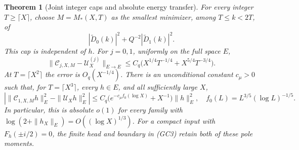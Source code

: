 \documentclass[11pt]{article}
\newtheorem{theorem}{Theorem}
\theoremstyle{remark}\newtheorem{remark}[theorem]{Remark}
\begin{document}
\begin{theorem}[Joint integer caps and absolute energy transfer]
\label{thm:joint-integer-gamma-completion}
For every integer \(T\ge\lceil X\rceil\), choose \(M=M_*(X,T)\)
as the smallest minimizer, among \(T\le k<2T\), of
\[
 |\widetilde D_0(k)|^2+Q^{-2}|\widetilde D_1(k)|^2 .
 \tag{GC4}
\]
This cap is independent of \(h\). For \(j=0,1\), uniformly on
the full space \(E\),
\[
 \|\mathcal C_{j,X,M}-\mathcal U_X^{(j)}\|_{E\to E}
 \le C_q\bigl(X^{1/4}T^{-1/4}+X^{5/4}T^{-3/4}\bigr).
 \tag{GC5}\label{eq:joint-gamma-error}
\]
At \(T=\lceil X^2\rceil\) the error is \(O_q(X^{-1/4})\).
There is an unconditional constant \(c_\mu>0\) such that,
for \(T=\lceil X^3\rceil\), every \(h\in E\), and all
sufficiently large \(X\),
\[
 \left|\|\mathcal C_{1,X,M}h\|_E^2-\|\mathcal U_Xh\|_E^2\right|
 \le C_q\bigl(e^{-c_\mu f_0(\log X)}+X^{-1}\bigr)\|h\|_E^2,
 \quad f_0(L)=L^{3/5}(\log L)^{-1/5}.
 \tag{GC6}\label{eq:joint-gamma-energy}
\]
In particular, this is absolute \(o(1)\) for every family with
\(\log(2+\|h_X\|_E)=O((\log X)^{1/3})\).
For a compact input with \(F_h(\pm i/2)=0\), the finite
head and boundary in (GC3) retain both of these pole moments.
\end{theorem}
\end{document}
